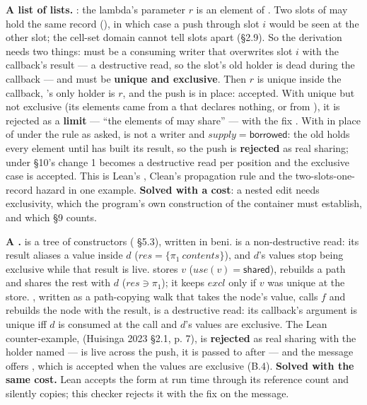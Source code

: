 \textbf{A list of lists.} : the lambda's parameter $r$ is an element of . Two slots of  may hold the same record (\code{[ r, r ]}), in which case a push through slot $i$ would be seen at the other slot; the cell-set domain cannot tell slots apart (§2.9). So the derivation needs two things:  must be a consuming writer that overwrites slot $i$ with the callback's result — a destructive read, so the slot's old holder is dead during the callback — and  must be \textbf{unique and exclusive}. Then $r$ is unique inside the callback, 's only holder is $r$, and the push is in place: accepted. With  unique but not exclusive (its elements came from a  that declares nothing, or from ), it is rejected as a \textbf{limit} — “the elements of  may share” — with the fix . With  in place of  under the rule as asked,  is not a writer and $\mathit{supply}=\mathsf{borrowed}$: the old  holds every element until  has built its result, so the push is \textbf{rejected} as real sharing; under §10's change 1  becomes a destructive read per position and the exclusive case is accepted. This is Lean's , Clean's propagation rule and the two-slots-one-record hazard in one example. \textbf{Solved with a cost}: a nested edit needs exclusivity, which the program's own construction of the container must establish, and which §9 counts.

\textbf{A .}  is a tree of constructors ( §5.3), written in beni.  is a non-destructive read: its result aliases a value inside $d$ ($\mathit{res}=\{\pi _{1}\ \mathit{contents}\}$), and $d$'s values stop being exclusive while that result is live.  stores $v$ ($\mathit{use}(v)=\mathsf{shared}$), rebuilds a path and shares the rest with $d$ ($\mathit{res}\ni \pi _{1}$); it keeps $\mathit{excl}$ only if $v$ was unique at the store. , written as a path-copying walk that takes the node's value, calls $f$ and rebuilds the node with the result, is a destructive read: its callback's argument is unique iff $d$ is consumed at the call and $d$'s values are exclusive. The Lean counter-example,  (Huisinga 2023 §2.1, p. 7), is \textbf{rejected} as real sharing with the holder named —  is live across the push, it is passed to  after — and the message offers , which is accepted when the values are exclusive (B.4). \textbf{Solved with the same cost.} Lean accepts the  form at run time through its reference count and silently copies; this checker rejects it with the fix on the message.

